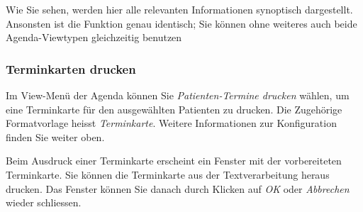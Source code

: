 Wie Sie sehen, werden hier alle relevanten Informationen synoptisch dargestellt. Ansonsten ist die Funktion genau identisch;
Sie können ohne weiteres auch beide Agenda-Viewtypen gleichzeitig benutzen

\subsubsection{Terminkarten drucken}

Im View-Menü der Agenda können Sie \textit{Patienten-Termine drucken} wählen, um eine Terminkarte
für den ausgewählten Patienten zu drucken. Die Zugehörige Formatvorlage heisst \textit{Terminkarte}.
Weitere Informationen zur Konfiguration finden Sie weiter oben.

Beim Ausdruck einer Terminkarte erscheint ein Fenster mit der vorbereiteten Terminkarte.
Sie können die Terminkarte aus der Textverarbeitung heraus drucken. Das Fenster können Sie
danach durch Klicken auf \textit{OK} oder \textit{Abbrechen} wieder schliessen.

